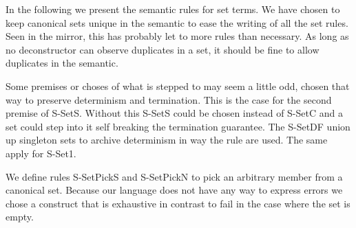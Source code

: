 \documentclass[a4paper]{article}
\begin{document}
In the following we present the semantic rules for set terms. We have chosen to keep canonical sets unique in the semantic to ease the writing of all the set rules. Seen in the mirror, this has probably let to more rules than necessary. As long as no deconstructor can observe duplicates in a set, it should be fine to allow duplicates in the semantic.

Some premises or choses of what is stepped to may seem a little odd, chosen that way to preserve determinism and termination. This is the case for the second premise of S-SetS. Without this S-SetS could be chosen instead of S-SetC and a set could step into it self breaking the termination guarantee. The S-SetDF union up singleton sets to archive determinism in way the rule are used. The same apply for S-Set1.

We define rules S-SetPickS and S-SetPickN to pick an arbitrary member from a canonical set. Because our language does not have any way to express errors we chose a construct that is exhaustive in contrast to fail in the case where the set is empty.
\end{document}
